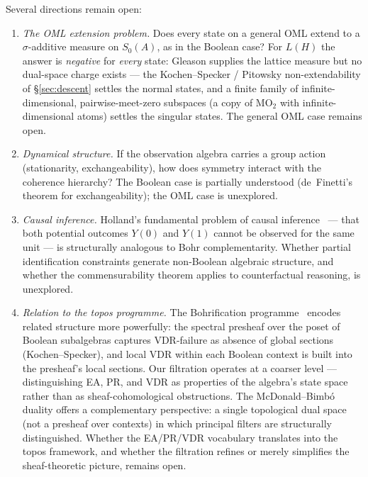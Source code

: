 Several directions remain open:
\begin{enumerate}
  \item \emph{The OML extension problem.}
    Does every state on a general OML extend to a $\sigma$-additive
    measure on $S_0(A)$, as in the Boolean case?  For $L(H)$ the answer
    is \emph{negative} for \emph{every} state: Gleason supplies the
    lattice measure but no dual-space charge exists --- the
    Kochen--Specker / Pitowsky non-extendability of \S\ref{sec:descent}
    settles the normal states, and a
    finite family of infinite-dimensional, pairwise-meet-zero subspaces
    (a copy of $\mathrm{MO}_2$ with infinite-dimensional atoms) settles
    the singular states. The general OML case remains open.

  \item \emph{Dynamical structure.}
    If the observation algebra carries a group action (stationarity,
    exchangeability), how does symmetry interact with the coherence
    hierarchy?  The Boolean case is partially understood
    (de~Finetti's theorem for exchangeability); the OML case is
    unexplored.

  \item \emph{Causal inference.}
    Holland's fundamental problem of causal
    inference~\cite{Holland1986} --- that both potential outcomes
    $Y(0)$ and $Y(1)$ cannot be observed for the same unit --- is
    structurally analogous to Bohr complementarity.  Whether partial
    identification constraints generate non-Boolean algebraic
    structure, and whether the commensurability theorem applies to
    counterfactual reasoning, is unexplored.

  \item \emph{Relation to the topos programme.}
    The Bohrification programme~\cite{IshamButterfield1998,
    DoeringIsham2008, HeunenLandsmanSpitters2009} encodes related
    structure more powerfully: the spectral presheaf over the poset
    of Boolean subalgebras captures VDR-failure as absence of global
    sections (Kochen--Specker), and local VDR within each Boolean
    context is built into the presheaf's local sections.  Our
    filtration operates at a coarser level --- distinguishing EA, PR,
    and VDR as properties of the algebra's state space rather than as
    sheaf-cohomological obstructions.  The McDonald--Bimb\'{o} duality
    offers a complementary perspective: a single topological dual
    space (not a presheaf over contexts) in which principal filters
    are structurally distinguished.  Whether the EA/PR/VDR vocabulary
    translates into the topos framework, and whether the filtration
    refines or merely simplifies the sheaf-theoretic picture, remains
    open.
\end{enumerate}

\ifstandalone


\fi
